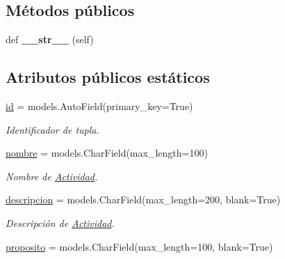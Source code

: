 \subsection*{Métodos públicos}
\begin{DoxyCompactItemize}
\item 
def {\bfseries \+\_\+\+\_\+str\+\_\+\+\_\+} (self)\hypertarget{classappEmotionIOT_1_1models_1_1Actividad_a266311802b48903898e4281578038d37}{}\label{classappEmotionIOT_1_1models_1_1Actividad_a266311802b48903898e4281578038d37}

\end{DoxyCompactItemize}
\subsection*{Atributos públicos estáticos}
\begin{DoxyCompactItemize}
\item 
\hyperlink{classappEmotionIOT_1_1models_1_1Actividad_a7377aff8b960a1c3a5886c47a8efa5a2}{id} = models.\+Auto\+Field(primary\+\_\+key=True)\hypertarget{classappEmotionIOT_1_1models_1_1Actividad_a7377aff8b960a1c3a5886c47a8efa5a2}{}\label{classappEmotionIOT_1_1models_1_1Actividad_a7377aff8b960a1c3a5886c47a8efa5a2}

\begin{DoxyCompactList}\small\item\em Identificador de tupla. \end{DoxyCompactList}\item 
\hyperlink{classappEmotionIOT_1_1models_1_1Actividad_a2a8dbb938af992f9179f3a7988a9de48}{nombre} = models.\+Char\+Field(max\+\_\+length=100)\hypertarget{classappEmotionIOT_1_1models_1_1Actividad_a2a8dbb938af992f9179f3a7988a9de48}{}\label{classappEmotionIOT_1_1models_1_1Actividad_a2a8dbb938af992f9179f3a7988a9de48}

\begin{DoxyCompactList}\small\item\em Nombre de \hyperlink{classappEmotionIOT_1_1models_1_1Actividad}{Actividad}. \end{DoxyCompactList}\item 
\hyperlink{classappEmotionIOT_1_1models_1_1Actividad_a060109db63b1ad0287a619955f058249}{descripcion} = models.\+Char\+Field(max\+\_\+length=200, blank=True)\hypertarget{classappEmotionIOT_1_1models_1_1Actividad_a060109db63b1ad0287a619955f058249}{}\label{classappEmotionIOT_1_1models_1_1Actividad_a060109db63b1ad0287a619955f058249}

\begin{DoxyCompactList}\small\item\em Descripción de \hyperlink{classappEmotionIOT_1_1models_1_1Actividad}{Actividad}. \end{DoxyCompactList}\item 
\hyperlink{classappEmotionIOT_1_1models_1_1Actividad_a00df7e191279fb65c1adede2b6fd0b26}{proposito} = models.\+Char\+Field(max\+\_\+length=100, blank=True)\hypertarget{classappEmotionIOT_1_1models_1_1Actividad_a00df7e191279fb65c1adede2b6fd0b26}{}\label{classappEmotionIOT_1_1models_1_1Actividad_a00df7e191279fb65c1adede2b6fd0b26}


\end{DoxyCompactItemize}

